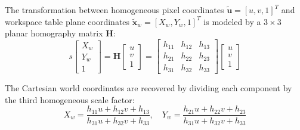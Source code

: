 \documentclass{svproc}
\begin{document}
\begin{table}[htbp]
\caption{Ground-Truth World Coordinates of the Twelve ArUco Calibration Markers.}
\label{tab:aruco_coords}
\centering
{}
\end{table}

The transformation between homogeneous pixel coordinates $\tilde{\mathbf{u}} = [u, v, 1]^T$ and workspace table plane coordinates $\tilde{\mathbf{x}}_w = [X_w, Y_w, 1]^T$ is modeled by a $3 \times 3$ planar homography matrix $\mathbf{H}$:
\begin{equation}
    s \begin{bmatrix} X_w \\ Y_w \\ 1 \end{bmatrix} = \mathbf{H} \begin{bmatrix} u \\ v \\ 1 \end{bmatrix} = \begin{bmatrix} h_{11} & h_{12} & h_{13} \\ h_{21} & h_{22} & h_{23} \\ h_{31} & h_{32} & h_{33} \end{bmatrix} \begin{bmatrix} u \\ v \\ 1 \end{bmatrix}
\end{equation}

The Cartesian world coordinates are recovered by dividing each component by the third homogeneous scale factor:
\begin{equation}
    X_w = \frac{h_{11}u + h_{12}v + h_{13}}{h_{31}u + h_{32}v + h_{33}}, \quad Y_w = \frac{h_{21}u + h_{22}v + h_{23}}{h_{31}u + h_{32}v + h_{33}}
\end{equation}
\end{document}
